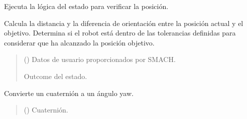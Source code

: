 \documentclass[a4paper,10pt,spanish]{sphinxmanual}
\begin{document}
\begin{fulllineitems}
\begin{fulllineitems}
\end{fulllineitems}


\begin{fulllineitems}
\label{\detokenize{squad_approach_control_action:squad_approach_control_action.CheckPositionState.execute}}
\pysigstartsignatures
{}
\pysigstopsignatures
\sphinxAtStartPar
Ejecuta la lógica del estado para verificar la posición.

\sphinxAtStartPar
Calcula la distancia y la diferencia de orientación entre la posición actual y el objetivo.
Determina si el robot está dentro de las tolerancias definidas para considerar que ha
alcanzado la posición objetivo.
\begin{quote}\begin{description}
\sphinxAtStartPar
{} () \textendash{} Datos de usuario proporcionados por SMACH.

\sphinxAtStartPar
Outcome del estado.

\sphinxAtStartPar
{}

\end{description}\end{quote}

\end{fulllineitems}


\begin{fulllineitems}
\label{\detokenize{squad_approach_control_action:squad_approach_control_action.CheckPositionState.quaternion_to_yaw}}
\pysigstartsignatures
{}
\pysigstopsignatures
\sphinxAtStartPar
Convierte un cuaternión a un ángulo yaw.
\begin{quote}\begin{description}
\sphinxAtStartPar
{} () \textendash{} Cuaternión.


\end{description}
\end{quote}
\end{fulllineitems}
\end{fulllineitems}
\end{document}
